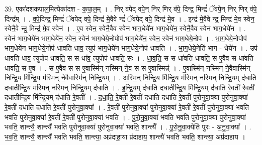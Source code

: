 \documentclass[17pt]{extarticle}
\begin{document}
39. एका॑दशकपाल॒मित्येका॑दश - क॒पा॒ल॒म् । . निर् व॑पेद् वपे॒न् निर् णिर् व॑पे॒ दिन्द्र॒ मिन्द्रं॑ ॅवपे॒न् निर् णिर् व॑पे॒ दिन्द्र᳚म् । . व॒पे॒दिन्द्र॒ मिन्द्रं॑ ॅवपेद् वपे॒ दिन्द्र॑ मे॒वैवे न्द्रं॑ ॅवपेद् वपे॒ दिन्द्र॑ मे॒व । . इन्द्र॑ मे॒वैवे न्द्र॒ मिन्द्र॑ मे॒व स्वेन॒ स्वेनै॒वे न्द्र॒ मिन्द्र॑ मे॒व स्वेन॑ । . ए॒व स्वेन॒ स्वेनै॒वैव स्वेन॑ भाग॒धेये॑न भाग॒धेये॑न॒ स्वेनै॒वैव स्वेन॑ भाग॒धेये॑न । . स्वेन॑ भाग॒धेये॑न भाग॒धेये॑न॒ स्वेन॒ स्वेन॑ भाग॒धेये॒नोपोप॑ भाग॒धेये॑न॒ स्वेन॒ स्वेन॑ भाग॒धेये॒नोप॑ । . भा॒ग॒धेये॒नोपोप॑ भाग॒धेये॑न भाग॒धेये॒नोप॑ धावति धाव॒ त्युप॑ भाग॒धेये॑न भाग॒धेये॒नोप॑ धावति । . भा॒ग॒धेये॒नेति॑ भाग - धेये॑न । . उप॑ धावति धाव॒ त्युपोप॑ धावति॒ स स धा॑व॒ त्युपोप॑ धावति॒ सः । . धा॒व॒ति॒ स स धा॑वति धावति॒ स ए॒वैव स धा॑वति धावति॒ स ए॒व । . स ए॒वैव स स ए॒वास्मि॑न् नस्मिन् ने॒व स स ए॒वास्मिन्न्॑ । . ए॒वास्मि॑न् नस्मिन् ने॒वैवास्मि॑न् निन्द्रि॒य मि॑न्द्रि॒य म॑स्मिन् ने॒वैवास्मि॑न् निन्द्रि॒यम् । . अ॒स्मि॒न् नि॒न्द्रि॒य मि॑न्द्रि॒य म॑स्मिन् नस्मिन् निन्द्रि॒यम् द॑धाति दधातीन्द्रि॒य म॑स्मिन् नस्मिन् निन्द्रि॒यम् द॑धाति । . इ॒न्द्रि॒यम् द॑धाति दधातीन्द्रि॒य मि॑न्द्रि॒यम् द॑धाति रे॒वती॑ रे॒वती॑ दधातीन्द्रि॒य मि॑न्द्रि॒यम् द॑धाति रे॒वती᳚ । . द॒धा॒ति॒ रे॒वती॑ रे॒वती॑ दधाति दधाति रे॒वती॑ पुरोनुवा॒क्या॑ पुरोनुवा॒क्या॑ रे॒वती॑ दधाति दधाति रे॒वती॑ पुरोनुवा॒क्या᳚ । . रे॒वती॑ पुरोनुवा॒क्या॑ पुरोनुवा॒क्या॑ रे॒वती॑ रे॒वती॑ पुरोनुवा॒क्या॑ भवति भवति पुरोनुवा॒क्या॑ रे॒वती॑ रे॒वती॑ पुरोनुवा॒क्या॑ भवति । . पु॒रो॒नु॒वा॒क्या॑ भवति भवति पुरोनुवा॒क्या॑ पुरोनुवा॒क्या॑ भवति॒ शान्त्यै॒ शान्त्यै॑ भवति पुरोनुवा॒क्या॑ पुरोनुवा॒क्या॑ भवति॒ शान्त्यै᳚ । . पु॒रो॒नु॒वा॒क्येति॑ पुरः - अ॒नु॒वा॒क्या᳚ । . भ॒व॒ति॒ शान्त्यै॒ शान्त्यै॑ भवति भवति॒ शान्त्या॒ अप्र॑दाहा॒या प्र॑दाहाय॒ शान्त्यै॑ भवति भवति॒ शान्त्या॒ अप्र॑दाहाय । \newline
\end{document}
